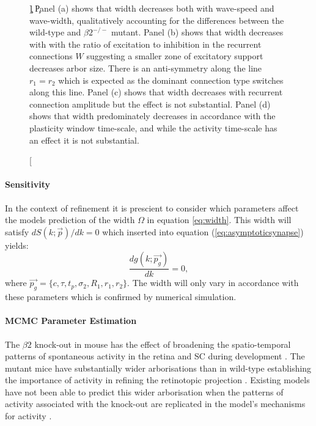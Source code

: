 \begin{figure}[h!]
	\caption[\c]{\label{fig:parametereximinations} \c Panel (a) shows that width decreases both with wave-speed and wave-width, qualitatively accounting for the differences between the wild-type and $\beta2^{-/-}$ mutant. Panel (b) shows that width decreases with with the ratio of excitation to inhibition in the recurrent connections $W$ suggesting a smaller zone of excitatory support decreases arbor size. There is an anti-symmetry along the line $r_1 = r_2$ which is expected as the dominant connection type switches along this line.  Panel (c) shows that width decreases with recurrent connection amplitude but the effect is not substantial. Panel (d) shows that width predominately decreases in accordance with the plasticity window time-scale, and while the activity time-scale has an effect it is not substantial.}
\end{figure}

\paragraph{Sensitivity}
{ In the context of refinement it is prescient to consider which parameters affect the models prediction of the width $\Omega$ in equation \ref{eq:width}. This width will satisfy $dS(k; \vec{p})/dk = 0$ which inserted into equation (\ref{eq:asymptoticsynapse}) yields:}
\begin{equation}
	\frac{dg(k; \vec{p_g})}{dk} = 0,
\end{equation}
where $\vec{p_g} = \{c, \tau, t_p, \sigma_2, R_1, r_1, r_2\}$. The width will only vary in accordance with these parameters which is confirmed by numerical simulation.


\paragraph{MCMC Parameter Estimation}
The $\beta2$ knock-out in mouse has the effect of broadening the spatio-temporal patterns of spontaneous activity in the retina and SC during development \cite{ Stafford2009}. The mutant mice have substantially wider arborisations than in wild-type establishing the importance of activity in refining the retinotopic projection \cite{Dhande2011-jp}. Existing models have not been able to predict this wider arborisation when the patterns of activity associated with the knock-out are replicated in the model's mechanisms for activity \cite{Lyngholm2019-fs}.

